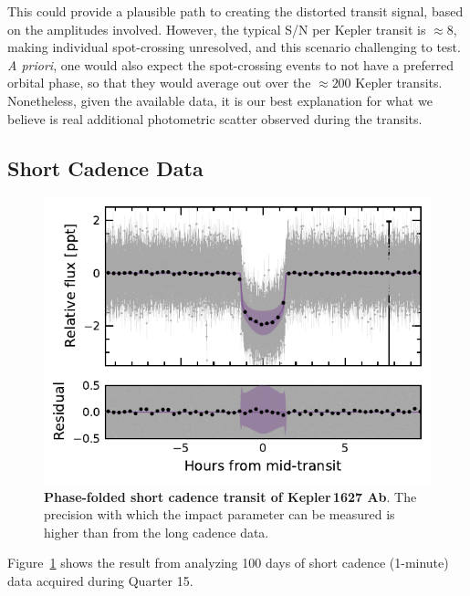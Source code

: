 \documentclass[12pt,modern,tighten]{aastex63}
\begin{document}
This could provide a plausible path to creating the distorted transit
signal, based on the amplitudes involved.  However, the typical S/N
per Kepler transit is $\approx8$, making individual spot-crossing
unresolved, and this scenario challenging to test.  {\it A priori},
one would also expect the spot-crossing events to not have a preferred
orbital phase, so that they would average out over the $\approx200$
Kepler transits.  Nonetheless, given the available data, it is our
best explanation for what we believe is real additional photometric
scatter observed during the transits.

\subsection{Short Cadence Data}

\begin{figure}[t]
	\begin{center}
		\leavevmode
		\includegraphics[width=1\textwidth]{f12.pdf}
	\end{center}
	\vspace{-0.7cm}
	\caption{
		{\bf Phase-folded short cadence transit of Kepler\,1627 Ab}.  
    The precision with which the impact parameter can be measured is
    higher than from the long cadence data.
		\label{fig:phase_slc}
	}
\end{figure}

Figure~\ref{fig:phase_slc} shows the result from analyzing 100 days of
short cadence (1-minute) data acquired during Quarter 15.
\end{document}
